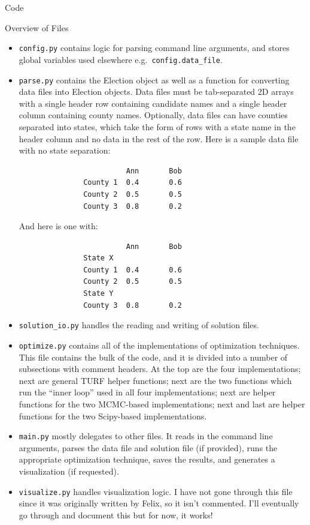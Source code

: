 \documentclass{article}
\begin{document}
\begin{section}{Code}
\begin{subsection}{Overview of Files}
\begin{itemize}
\item \texttt{config.py} contains logic for parsing command line arguments, and stores global variables used elsewhere e.g.\ \texttt{config.data\_file}.
\item \texttt{parse.py} contains the Election object as well as a function for converting data files into Election objects. Data files must be tab-separated 2D arrays with a single header row containing candidate names and a single header column containing county names. Optionally, data files can have counties separated into states, which take the form of rows with a state name in the header column and no data in the rest of the row. Here is a sample data file with no state separation:
\begin{verbatim}
                         Ann       Bob
               County 1  0.4       0.6
               County 2  0.5       0.5
               County 3  0.8       0.2
\end{verbatim}And here is one with:\begin{verbatim}
                         Ann       Bob
               State X
               County 1  0.4       0.6
               County 2  0.5       0.5
               State Y
               County 3  0.8       0.2
\end{verbatim}

\item \texttt{solution\_io.py} handles the reading and writing of solution files.
\item \texttt{optimize.py} contains all of the implementations of optimization techniques. This file contains the bulk of the code, and it is divided into a number of subsections with comment headers. At the top are the four implementations; next are general TURF helper functions; next are the two functions which run the ``inner loop'' used in all four implementations; next are helper functions for the two MCMC-based implementations; next and last are helper functions for the two Scipy-based implementations.
\item \texttt{main.py} mostly delegates to other files. It reads in the command line arguments, parses the data file and solution file (if provided), runs the appropriate optimization technique, saves the results, and generates a visualization (if requested).
\item \texttt{visualize.py} handles visualization logic. I have not gone through this file since it was originally written by Felix, so it isn't commented. I'll eventually go through and document this but for now, it works!
\end{itemize}
\end{subsection}


\end{section}
\end{document}
